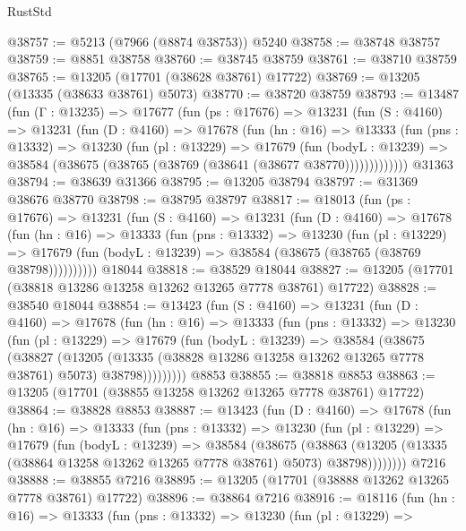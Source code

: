 \begin{lexlean}{RustStd}
\begin{coremodule}
@38757 := @5213 (@7966 (@8874 @38753)) @5240
@38758 := @38748 @38757
@38759 := @8851 @38758
@38760 := @38745 @38759
@38761 := @38710 @38759
@38765 := @13205 (@17701 (@38628 @38761) @17722)
@38769 := @13205 (@13335 (@38633 @38761) @5073)
@38770 := @38720 @38759
@38793 := @13487
    (fun (Γ : @13235) =>
    @17677
      (fun (ps : @17676) =>
      @13231
        (fun (S : @4160) =>
        @13231
          (fun (D : @4160) =>
          @17678
            (fun (hn : @16) =>
            @13333
              (fun (pns : @13332) =>
              @13230
                (fun (pl : @13229) =>
                @17679
                  (fun (bodyL : @13239) =>
                  @38584 (@38675 (@38765 (@38769 (@38641 (@38677 @38770)))))))))))))
    @31363
@38794 := @38639 @31366
@38795 := @13205 @38794
@38797 := @31369 @38676 @38770
@38798 := @38795 @38797
@38817 := @18013
    (fun (ps : @17676) =>
    @13231
      (fun (S : @4160) =>
      @13231
        (fun (D : @4160) =>
        @17678
          (fun (hn : @16) =>
          @13333
            (fun (pns : @13332) =>
            @13230
              (fun (pl : @13229) =>
              @17679 (fun (bodyL : @13239) => @38584 (@38675 (@38765 (@38769 @38798))))))))))
    @18044
@38818 := @38529 @18044
@38827 := @13205 (@17701 (@38818 @13286 @13258 @13262 @13265 @7778 @38761) @17722)
@38828 := @38540 @18044
@38854 := @13423
    (fun (S : @4160) =>
    @13231
      (fun (D : @4160) =>
      @17678
        (fun (hn : @16) =>
        @13333
          (fun (pns : @13332) =>
          @13230
            (fun (pl : @13229) =>
            @17679
              (fun (bodyL : @13239) =>
              @38584
                (@38675
                  (@38827
                    (@13205
                      (@13335 (@38828 @13286 @13258 @13262 @13265 @7778 @38761) @5073)
                      @38798)))))))))
    @8853
@38855 := @38818 @8853
@38863 := @13205 (@17701 (@38855 @13258 @13262 @13265 @7778 @38761) @17722)
@38864 := @38828 @8853
@38887 := @13423
    (fun (D : @4160) =>
    @17678
      (fun (hn : @16) =>
      @13333
        (fun (pns : @13332) =>
        @13230
          (fun (pl : @13229) =>
          @17679
            (fun (bodyL : @13239) =>
            @38584
              (@38675
                (@38863
                  (@13205 (@13335 (@38864 @13258 @13262 @13265 @7778 @38761) @5073) @38798))))))))
    @7216
@38888 := @38855 @7216
@38895 := @13205 (@17701 (@38888 @13262 @13265 @7778 @38761) @17722)
@38896 := @38864 @7216
@38916 := @18116
    (fun (hn : @16) =>
    @13333
      (fun (pns : @13332) =>
      @13230
        (fun (pl : @13229) =>

\end{coremodule}
\end{lexlean}
